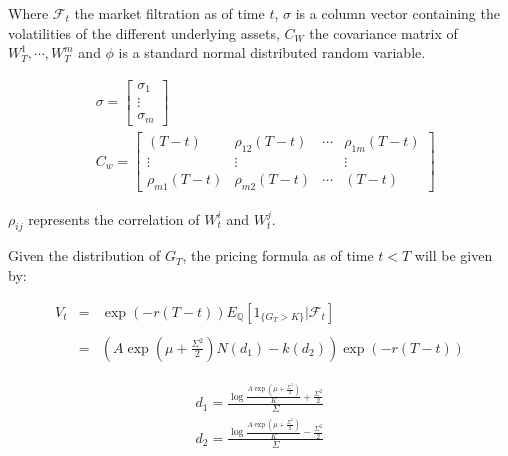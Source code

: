 Where $\mathcal{F}_t$ the market filtration as of time $t$, $\sigma$ is a column vector containing the volatilities of the different underlying assets, $C_W$ the covariance matrix of $W_T^1,\cdots,W_T^m$ and $\phi$ is a standard normal distributed random variable.
 

\begin{equation} \label{eq:geom_digital_distrib_params2}
\begin{aligned}
&\sigma=\left[\begin{array}{c}
\sigma_{1} \\
\vdots \\
\sigma_{m}
\end{array}\right] \\
&C_{w}=\left[\begin{array}{cccc}
\left(T-t\right) & \rho_{12} \left(T-t\right) & \cdots & \rho_{1 m} \left(T-t\right) \\
\vdots & \vdots & & \vdots \\
\rho_{m 1} \left(T-t\right) & \rho_{m 2} \left(T-t\right) & \cdots &  \left(T-t\right)
\end{array}\right]
\end{aligned}
\end{equation} 

$\rho_{ij}$ represents the correlation of $W_t^i$ and $W_t^j$.

Given the distribution of $G_T$, the pricing formula as of time $t<T$ will be given by:

$$
\begin{array}{lll}
V_{t}&=&\exp (-r(T-t)) E_{\mathbb{Q}}\left[1_{\{G_{T}>K\}} | \mathcal{F}_t\right] \\
&& \\
&=&\left(A\exp\left(\mu+\frac{\Sigma^2}{2}\right)N\left(d_1\right)-k\left(d_2\right)\right)\exp\left(-r(T-t)\right)
\end{array}
$$

$$
\begin{aligned}
d_1 = \frac{\log\frac{A\exp\left(\mu+\frac{\Sigma^2}{2}\right)}{K}+\frac{\Sigma^2}{2}}{\Sigma} \\
d_2 = \frac{\log\frac{A\exp\left(\mu+\frac{\Sigma^2}{2}\right)}{K}-\frac{\Sigma^2}{2}}{\Sigma} \\
\end{aligned}
$$


